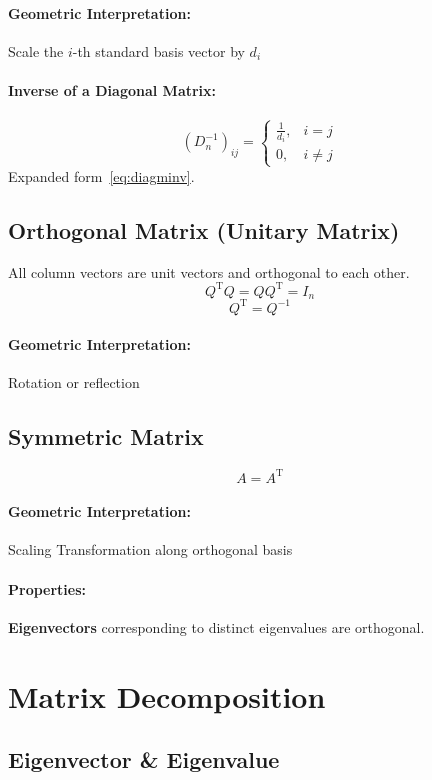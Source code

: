 \documentclass{article}
\begin{document}
\paragraph{Geometric Interpretation:} Scale the $i$-th standard basis vector by $d_i$
\paragraph{Inverse of a Diagonal Matrix:}
\[
    (D_n^{-1})_{ij} =
    \begin{cases}
        \frac{1}{d_i}, & i = j \\
        0, & i \neq j
    \end{cases}
\]
Expanded form~\ref{eq:diagminv}.

\subsection{Orthogonal Matrix (Unitary Matrix)}
All column vectors are unit vectors and orthogonal to each other.
\[
    Q^{\mathrm{T}} Q = Q Q^{\mathrm{T}} = I_n
\]
\[
    Q^{\mathrm{T}} = Q^{-1}
\]
\paragraph{Geometric Interpretation:} Rotation or reflection

\subsection{Symmetric Matrix}
\[
    A = A^{\mathrm{T}}
\]
\paragraph{Geometric Interpretation:} Scaling Transformation along orthogonal basis
\paragraph{Properties:} \textbf{Eigenvectors} corresponding to distinct eigenvalues are orthogonal.


\newpage
\section{Matrix Decomposition}

\subsection{Eigenvector \& Eigenvalue}
\end{document}

